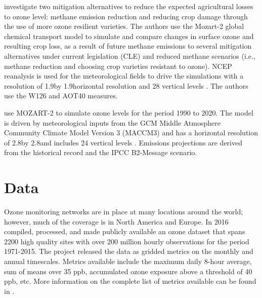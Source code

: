 \documentclass[10pt]{amsart}
\begin{document}
\cite{avnery:2013ab} investigate two mitigation alternatives to reduce the expected agricultural losses to ozone level: methane emission reduction and reducing crop damage through the use of more ozone resilient varieties.
The authors use the Mozart-2 global chemical transport model to simulate and compare changes in surface ozone and resulting crop loss, as a result of future methane emissions to several mitigation alternatives under current legislation (CLE) and reduced methane scenarios (i.e., methane reduction and choosing crop varieties resistant to ozone). 
NCEP reanalysis is used for the meteorological fields to drive the simulations with a resolution of 1.9\degree by 1.9\degree horizontal resolution and 28 vertical levels \parencite{avnery:2013ab}.
The authors use the W126 and AOT40 measures.

\cite{wang:2004aa} use MOZART-2 to simulate ozone levels for the period 1990 to 2020. 
The model is driven by meteorological inputs from the GCM Middle Atmosphere Community Climate Model Version 3 (MACCM3) and has a horizontal resolution of 2.8\degree by 2.8\degree and includes 24 vertical levels \parencite{wang:2004aa}. 
Emissions projections are derived from the historical record and the IPCC B2-Message scenario. 


\begin{landscape}
\begin{table}
\end{table}
\end{landscape}

\section{Data}
Ozone monitoring networks are in place at many locations around the world; however, much of the coverage is in North America and Europe. 
In 2016 \cite{sofen:2016aa} compiled, processed, and made publicly available an ozone dataset that spans 2200 high quality sites with over 200 million hourly observations for the period 1971-2015.
The project released the data as gridded metrics on the monthly and annual timescales.
Metrics available include the maximum daily 8-hour average, sum of means over 35 ppb, accumulated ozone exposure above a threshold of 40 ppb, etc. 
More information on the complete list of metrics available can be found in \cite{sofen:2016aa}.
\end{document}
